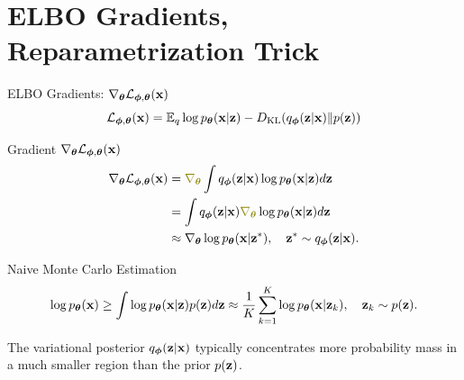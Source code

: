 \documentclass{beamer}
\renewcommand{\eqpause}{}
\renewcommand{\nextonslide}[1]{#1}
\begin{document}
\section{ELBO Gradients, Reparametrization Trick}
\begin{frame}{ELBO Gradients: $\nabla_{\boldsymbol{\theta}} \mathcal{L}_{\boldsymbol{\phi}, \boldsymbol{\theta}}(\mathbf{x})$}
	\vspace{-0.3cm}
	\[
	 	\mathcal{L}_{\boldsymbol{\phi}, \boldsymbol{\theta}}(\mathbf{x}) = \mathbb{E}_{q} \log p_{\boldsymbol{\theta}}(\mathbf{x} | \mathbf{z}) - D_\mathrm{KL} (q_{\boldsymbol{\phi}}(\mathbf{z}| \mathbf{x}) \| p(\mathbf{z}))
	\]
	\vspace{-0.5cm}
	\eqpause
	\begin{block}{Gradient $\nabla_{\boldsymbol{\theta}} \mathcal{L}_{\boldsymbol{\phi}, \boldsymbol{\theta}}(\mathbf{x})$}
		\vspace{-0.7cm}
		\begin{align*}
			\nabla_{\btheta} \cL_{\bphi, \btheta}(\bx)
			&= {\color{olive}\nabla_{\btheta}} \int q_{\bphi}(\bz| \bx) \log \pt(\bx| \bz) d \bz 
			\nextonslide{\\ &= \int q_{\bphi}(\bz| \bx) {\color{olive}\nabla_{\btheta}} \log \pt(\bx| \bz) d \bz}
			\nextonslide{\\ &\approx \nabla_{\btheta}\log \pt(\bx|\bz^*), \quad \bz^* \sim q_{\bphi}(\bz| \bx).}
		\end{align*}
		\vspace{-0.9cm}
	\end{block}
	\eqpause
	\begin{block}{Naive Monte Carlo Estimation}
		\vspace{-0.7cm}
		\[
			\log p_{\boldsymbol{\theta}}(\mathbf{x}) \geq \int \log p_{\boldsymbol{\theta}}(\mathbf{x} | \mathbf{z}) p(\mathbf{z}) d\mathbf{z} \approx \frac{1}{K} \sum_{k=1}^{K} \log p_{\boldsymbol{\theta}}(\mathbf{x} | \mathbf{z}_k), \quad \mathbf{z}_k \sim p(\mathbf{z}).
		\]
		\vspace{-0.5cm} 
	\end{block}
	\eqpause
	The variational posterior $q_{\boldsymbol{\phi}}(\mathbf{z}| \mathbf{x})$ typically concentrates more probability mass in a much smaller region than the prior $p(\mathbf{z})$. 
\end{frame}
\end{document}
